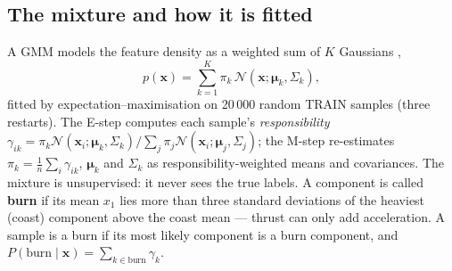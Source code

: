 \documentclass[11pt,a4paper]{article}
\begin{document}
\subsection{The mixture and how it is fitted}
A GMM models the feature density as a weighted sum of $K$ Gaussians \cite{dempster,sklearn},
\begin{equation}
  p(\mathbf x) = \sum_{k=1}^{K}\pi_k\,\mathcal N(\mathbf x;\bm\mu_k,\Sigma_k),
\end{equation}
fitted by expectation--maximisation on 20\,000 random TRAIN samples (three restarts). The E-step computes each
sample's \emph{responsibility} $\gamma_{ik} = \pi_k\mathcal N(\mathbf x_i;\bm\mu_k,\Sigma_k)/\sum_j \pi_j\mathcal N(\mathbf x_i;\bm\mu_j,\Sigma_j)$;
the M-step re-estimates $\pi_k = \tfrac1n\sum_i\gamma_{ik}$, $\bm\mu_k$ and $\Sigma_k$ as responsibility-weighted means
and covariances. The mixture is unsupervised: it never sees the true labels. A component is called
\textbf{burn} if its mean $x_1$ lies more than three standard deviations of the heaviest (coast) component above the
coast mean --- thrust can only add acceleration. A sample is a burn if its most likely component is a burn
component, and $P(\text{burn}\mid\mathbf x) = \sum_{k\in\text{burn}}\gamma_{k}$.
\end{document}
